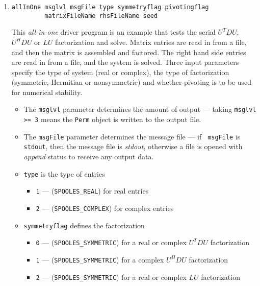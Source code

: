 \begin{enumerate}
\begin{itemize}
{\tt ETree\_readFromFile()} method.
\item
The {\tt mapFile} parameter is the input file for the map {\tt IV}
object. It must be of the form {\tt *.ivf} or {\tt *.ivb}.
The {\tt IV} object is read from the file via the
{\tt IV\_readFromFile()} method.
\end{itemize}
\item
\begin{verbatim}
allInOne msglvl msgFile type symmetryflag pivotingflag
         matrixFileName rhsFileName seed
\end{verbatim}
This {\it all-in-one} driver program is an example that tests the
serial $U^TDU$, $U^HDU$ or $LU$ factorization and solve.
Matrix entries are read in from a file, and then the matrix 
is assembled and factored.
The right hand side entries are read in from a file, and the system
is solved.
Three input parameters specify the type of system (real or
complex),
the type of factorization (symmetric, Hermitian or nonsymmetric)
and whether pivoting is to be used for numerical stability.
\par
\begin{itemize}
\item
The {\tt msglvl} parameter determines the amount of output ---
taking {\tt msglvl >= 3} means the {\tt Perm} object is written
to the output file.
\item
The {\tt msgFile} parameter determines the message file --- if {\tt
msgFile} is {\tt stdout}, then the message file is {\it stdout},
otherwise a file is opened with {\it append} status to receive any
output data.
\item
{\tt type} is the type of entries
\begin{itemize}
\item {\tt 1} --- ({\tt SPOOLES\_REAL}) for real entries
\item {\tt 2} --- ({\tt SPOOLES\_COMPLEX}) for complex entries
\end{itemize}
\item
{\tt symmetryflag} defines the factorization
\begin{itemize}
\item {\tt 0} --- ({\tt SPOOLES\_SYMMETRIC}) 
for a real or complex $U^TDU$ factorization
\item {\tt 1} --- ({\tt SPOOLES\_SYMMETRIC}) 
for a complex $U^HDU$ factorization
\item {\tt 2} --- ({\tt SPOOLES\_SYMMETRIC}) 
for a real or complex $LU$ factorization

\end{itemize}
\end{itemize}
\end{enumerate}
